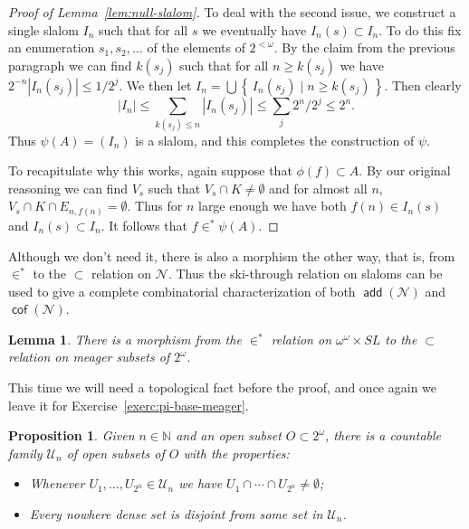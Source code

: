\documentclass[11pt,oneside,a4paper]{amsbook}
\newcommand{\set}[1]{\left\{\,#1\,\right\}}
\newcommand{\N}{\mathbb N}
\newcommand{\Null}{\mathcal N}
\DeclareMathOperator{\add}{\mathsf{add}}
\DeclareMathOperator{\cof}{\mathsf{cof}}
\theoremstyle{definition}
\theoremstyle{plain}
\newtheorem{lemma}[theorem]{Lemma}
\newtheorem{proposition}[theorem]{Proposition}
\theoremstyle{definition}
\theoremstyle{remark}
\numberwithin{equation}{section}
\numberwithin{figure}{section}
\begin{document}
\begin{proof}[Proof of Lemma~\ref{lem:null-slalom}]
  To deal with the second issue, we construct a single slalom $I_n$ such that for all $s$ we eventually have $I_n(s)\subset I_n$. To do this fix an enumeration $s_1,s_2,\ldots$ of the elements of $2^{<\omega}$. By the claim from the previous paragraph we can find $k(s_j)$ such that for all $n\geq k(s_j)$ we have $2^{-n}|I_n(s_j)|\leq1/2^j$. We then let $I_n=\bigcup\set{I_n(s_j)\mid n\geq k(s_j)}$. Then clearly
  \[|I_n|\leq\sum_{k(s_j)\leq n}|I_n(s_j)|\leq\sum_{j}2^n/2^j\leq2^n\text{.}
  \]
  Thus $\psi(A)=(I_n)$ is a slalom, and this completes the construction of $\psi$.

  To recapitulate why this works, again suppose that $\phi(f)\subset A$. By our original reasoning we can find $V_s$ such that $V_s\cap K\neq\emptyset$ and for almost all $n$, $V_s\cap K\cap E_{n,f(n)}=\emptyset$. Thus for $n$ large enough we have both $f(n)\in I_n(s)$ and $I_n(s)\subset I_n$. It follows that $f\in^*\psi(A)$.
\end{proof}

Although we don't need it, there is also a morphism the other way, that is, from $\in^*$ to the $\subset$ relation on $\Null$. Thus the ski-through relation on slaloms can be used to give a complete combinatorial characterization of both $\add(\Null)$ and $\cof(\Null)$.

\begin{lemma}
  \label{lem:slalom-meager}
  There is a morphism from the $\in^*$ relation on $\omega^\omega\times SL$ to the $\subset$ relation on meager subsets of $2^\omega$.
\end{lemma}

This time we will need a topological fact before the proof, and once again we leave it for Exercise~\ref{exerc:pi-base-meager}.

\begin{proposition}
  \label{prop:pi-base-meager}
  Given $n\in\N$ and an open subset $O\subset2^\omega$, there is a countable family $\mathcal U_n$ of open subsets of $O$ with the properties:
  \begin{itemize}
  \item Whenever $U_1,\ldots,U_{2^n}\in\mathcal U_n$ we have $U_1\cap\cdots\cap U_{2^n}\neq\emptyset$;
  \item Every nowhere dense set is disjoint from some set in $\mathcal U_n$.
  \end{itemize}
\end{proposition}
\end{document}
